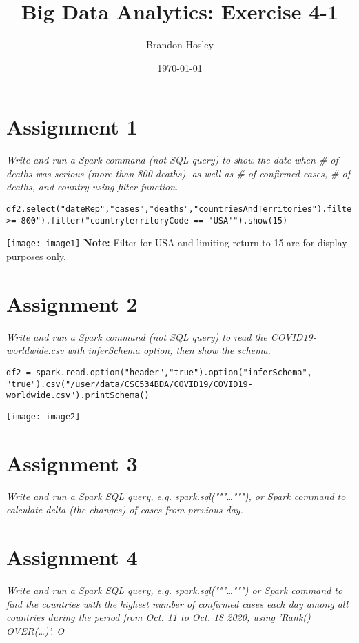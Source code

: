 \documentclass[]{article}
\title{Big Data Analytics: Exercise 4-1}
\author{Brandon Hosley}
\date{\today}
\begin{document}
\maketitle

\section*{Assignment 1}
\emph{ Write and run a Spark command (not SQL query) to show the date when # of deaths was serious (more than 800 deaths), as well as # of confirmed cases, # of deaths, and country using filter function. }
\begin{verbatim}
df2.select("dateRep","cases","deaths","countriesAndTerritories").filter("deaths >= 800").filter("countryterritoryCode == 'USA'").show(15)
\end{verbatim}
\texttt{[image: image1]} %
\textbf{Note:} Filter for USA and limiting return to 15 are for display purposes only.

\section*{Assignment 2}
\emph{ Write and run a Spark command (not SQL query) to read the COVID19-worldwide.csv with inferSchema option, then show the schema.
}

\begin{verbatim}
df2 = spark.read.option("header","true").option("inferSchema", "true").csv("/user/data/CSC534BDA/COVID19/COVID19-worldwide.csv").printSchema()
\end{verbatim}
\texttt{[image: image2]} %

\section*{Assignment 3}
\emph{ Write and run a Spark SQL query, e.g. spark.sql("""\ldots"""), or Spark command to calculate delta (the changes) of cases from previous day. }


\section*{Assignment 4}
\emph{ Write and run a Spark SQL query, e.g. spark.sql("""\ldots""") or Spark command to find the 	countries with the highest number of confirmed cases each day among all countries during the period from Oct. 11 to Oct. 18 2020, using 'Rank() OVER(\ldots)'. O }
\end{document}

